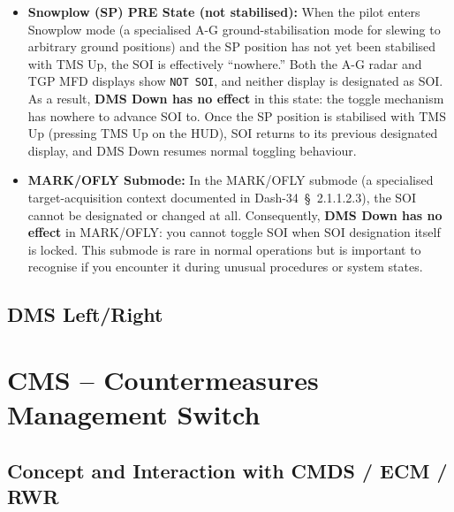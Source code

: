 \documentclass[11pt, a4paper, twoside]{report}
\providecommand{\dashref}[1]{Dash-34~\S~#1}
\begin{document}
\begin{itemize}
  \item \textbf{Snowplow (SP) PRE State (not stabilised):} When the pilot enters Snowplow mode (a specialised A-G ground-stabilisation mode for slewing to arbitrary ground positions) and the SP position has not yet been stabilised with TMS Up, the SOI is effectively ``nowhere.'' Both the A-G radar and TGP MFD displays show \texttt{NOT SOI}, and neither display is designated as SOI. As a result, \textbf{DMS Down has no effect} in this state: the toggle mechanism has nowhere to advance SOI to. Once the SP position is stabilised with TMS Up (pressing TMS Up on the HUD), SOI returns to its previous designated display, and DMS Down resumes normal toggling behaviour.

  \item \textbf{MARK/OFLY Submode:} In the MARK/OFLY submode (a specialised target-acquisition context documented in \dashref{2.1.1.2.3}), the SOI cannot be designated or changed at all. Consequently, \textbf{DMS Down has no effect} in MARK/OFLY: you cannot toggle SOI when SOI designation itself is locked. This submode is rare in normal operations but is important to recognise if you encounter it during unusual procedures or system states.
\end{itemize}

\section{DMS Left/Right}
\label{sec:C4-S4}

\chapter{CMS -- Countermeasures Management Switch}
\label{chap:C5}

\section{Concept and Interaction with CMDS / ECM / RWR}\label{sec:C5-S1}
\end{document}
